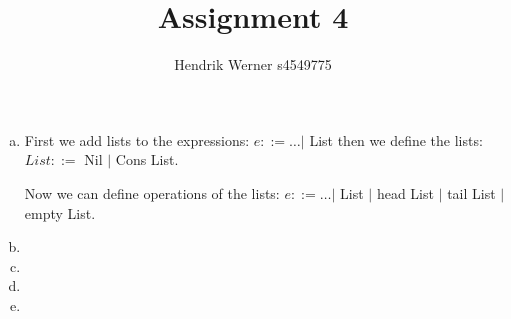 \documentclass[12pt, a4paper]{article}
\title{Assignment 4}
\author{Hendrik Werner s4549775}
\begin{document}
\maketitle

\section{} %

\section{} %
\begin{enumerate}[(a)]
	\item %
	First we add lists to the expressions:
	$e ::= \dots |$ List
	then we define the lists:
	$List ::=$ Nil $|$ Cons List.

	Now we can define operations of the lists: $e ::= \dots |$ List $|$ head List $|$ tail List $|$ empty List.
	\item %
	\item %
	\item %
	\item %
\end{enumerate}

\section{} %
\end{document}
